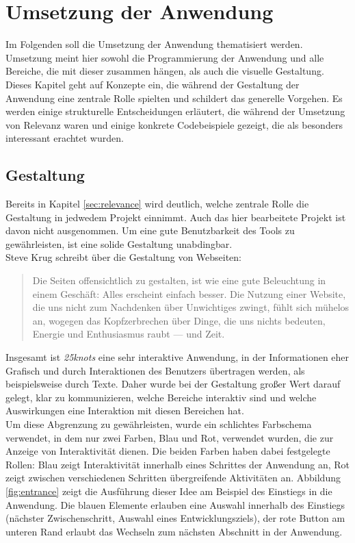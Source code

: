 \chapter{Umsetzung der Anwendung}
\thispagestyle{fancy}
Im Folgenden soll die Umsetzung der Anwendung thematisiert werden. Umsetzung meint hier sowohl die Programmierung der Anwendung und alle Bereiche, die mit dieser zusammen hängen, als auch die visuelle Gestaltung. Dieses Kapitel geht auf Konzepte ein, die während der Gestaltung der Anwendung eine zentrale Rolle spielten und schildert das generelle Vorgehen. Es werden einige strukturelle Entscheidungen erläutert, die während der Umsetzung von Relevanz waren und einige konkrete Codebeispiele gezeigt, die als besonders interessant erachtet wurden.

\section{Gestaltung}
Bereits in Kapitel \ref{sec:relevance} wird deutlich, welche zentrale Rolle die Gestaltung in jedwedem Projekt einnimmt. Auch das hier bearbeitete Projekt ist davon nicht ausgenommen. Um eine gute Benutzbarkeit des Tools zu gewährleisten, ist eine solide Gestaltung unabdingbar.\\
Steve Krug schreibt über die Gestaltung von Webseiten:

\begin{quote}
  Die Seiten offensichtlich zu gestalten, ist wie eine gute Beleuchtung in einem Geschäft: Alles erscheint einfach besser. Die Nutzung einer Website, die uns nicht zum Nachdenken über Unwichtiges zwingt, fühlt sich mühelos an, wogegen das Kopfzerbrechen über Dinge, die uns nichts bedeuten, Energie und Enthusiasmus raubt — und Zeit. \cite[S. 19]{Krug201410}
\end{quote}

Insgesamt ist \textit{25knots} eine sehr interaktive Anwendung, in der Informationen eher Grafisch und durch Interaktionen des Benutzers übertragen werden, als beispielsweise durch Texte.
Daher wurde bei der Gestaltung großer Wert darauf gelegt, klar zu kommunizieren, welche Bereiche interaktiv sind und welche Auswirkungen eine Interaktion mit diesen Bereichen hat.\\
Um diese Abgrenzung zu gewährleisten, wurde ein schlichtes Farbschema verwendet, in dem nur zwei Farben, Blau und Rot, verwendet wurden, die zur Anzeige von Interaktivität dienen.
Die beiden Farben haben dabei festgelegte Rollen: Blau zeigt Interaktivität innerhalb eines Schrittes der Anwendung an, Rot zeigt zwischen verschiedenen Schritten übergreifende Aktivitäten an. Abbildung \ref{fig:entrance} zeigt die Ausführung dieser Idee am Beispiel des Einstiegs in die Anwendung. Die blauen Elemente erlauben eine Auswahl innerhalb des Einstiegs (nächster Zwischenschritt, Auswahl eines Entwicklungsziels), der rote Button am unteren Rand erlaubt das Wechseln zum nächsten Abschnitt in der Anwendung.

